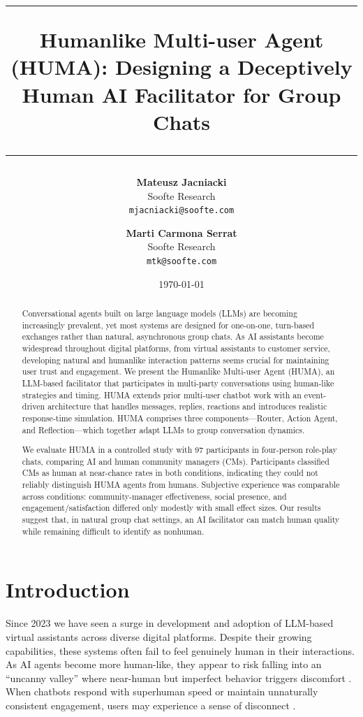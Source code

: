 \documentclass[twocolumn,10pt]{article}
\title{
    \vspace{-1cm}
    \rule{\textwidth}{1pt}
    \vspace{0.3cm}
    \Large\textbf{Humanlike Multi-user Agent (HUMA): Designing a Deceptively Human AI Facilitator for Group Chats}
    \vspace{0.3cm}
    \rule{\textwidth}{1pt}
}
\author{
    \textbf{Mateusz Jacniacki}\\
    Soofte Research \\
    \texttt{mjacniacki@soofte.com} \\
    \and
    \textbf{Marti Carmona Serrat} \\
    Soofte Research\\
    \texttt{mtk@soofte.com}
}
\date{\today}
\begin{document}
\maketitle

\raggedbottom

\begin{abstract}
Conversational agents built on large language models (LLMs) are becoming increasingly prevalent, yet most systems are designed for one-on-one, turn-based exchanges rather than natural, asynchronous group chats. As AI assistants become widespread throughout digital platforms, from virtual assistants to customer service, developing natural and humanlike interaction patterns seems crucial for maintaining user trust and engagement. We present the Humanlike Multi-user Agent (HUMA), an LLM-based facilitator that participates in multi-party conversations using human-like strategies and timing. HUMA extends prior multi-user chatbot work with an event-driven architecture that handles messages, replies, reactions and introduces realistic response-time simulation. HUMA comprises three components—Router, Action Agent, and Reflection—which together adapt LLMs to group conversation dynamics.

We evaluate HUMA in a controlled study with 97 participants in four-person role-play chats, comparing AI and human community managers (CMs). Participants classified CMs as human at near-chance rates in both conditions, indicating they could not reliably distinguish HUMA agents from humans. Subjective experience was comparable across conditions: community-manager effectiveness, social presence, and engagement/satisfaction differed only modestly with small effect sizes. Our results suggest that, in natural group chat settings, an AI facilitator can match human quality while remaining difficult to identify as nonhuman. 
\end{abstract}

\section{Introduction}
\label{sec:introduction}

Since 2023 we have seen a surge in development and adoption of LLM-based virtual assistants across diverse digital platforms. Despite their growing capabilities, these systems often fail to feel genuinely human in their interactions. As AI agents become more human-like, they appear to risk falling into an ``uncanny valley'' where near-human but imperfect behavior triggers discomfort \cite{ciechanowski2019uncanny}. When chatbots respond with superhuman speed or maintain unnaturally consistent engagement, users may experience a sense of disconnect \cite{gnewuch2022opposing}.
\end{document}
